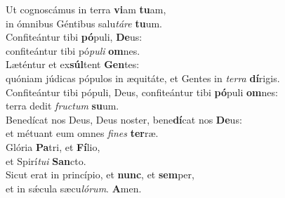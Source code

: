 \evenverse Ut cognoscámus in terra \textbf{vi}am \textbf{tu}am,~\*\\
\evenverse in ómnibus Géntibus salu\textit{tá}\textit{re} \textbf{tu}um.\\
\oddverse Confiteántur tibi \textbf{pó}puli, \textbf{De}us:~\*\\
\oddverse confiteántur tibi pó\textit{pu}\textit{li} \textbf{om}nes.\\
\evenverse Læténtur et ex\textbf{súl}tent \textbf{Gen}tes:~\*\\
\evenverse quóniam júdicas pópulos in æquitáte, et Gentes in \textit{ter}\textit{ra} \textbf{dí}rigis.\\
\oddverse Confiteántur tibi pópuli, Deus, confiteántur tibi \textbf{pó}puli \textbf{om}nes:~\*\\
\oddverse terra dedit \textit{fru}\textit{ctum} \textbf{su}um.\\
\evenverse Benedícat nos Deus, Deus noster, bene\textbf{dí}cat nos \textbf{De}us:~\*\\
\evenverse et métuant eum omnes \textit{fi}\textit{nes} \textbf{ter}ræ.\\
\oddverse Glória \textbf{Pa}tri, et \textbf{Fí}lio,~\*\\
\oddverse et Spirí\textit{tu}\textit{i} \textbf{San}cto.\\
\evenverse Sicut erat in princípio, et \textbf{nunc}, et \textbf{sem}per,~\*\\
\evenverse et in sǽcula sæcu\textit{ló}\textit{rum}. \textbf{A}men.\\
